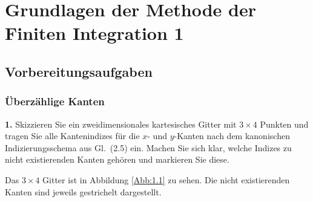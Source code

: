 \documentclass[Protokollheft.tex]{subfiles}
\begin{document}
\chapter{Grundlagen der Methode der Finiten Integration 1}
\section{Vorbereitungsaufgaben}
    {\subsection{Überzählige Kanten}}

        \begin{framed}
	\noindent \textbf{1.} Skizzieren Sie ein zweidimensionales kartesisches Gitter mit
        $3\times 4$ Punkten und tragen Sie alle Kantenindizes für die $x$-
        und $y$-Kanten nach dem kanonischen Indizierungsschema aus Gl.~(2.5) ein. Machen Sie sich klar, welche Indizes zu
        nicht existierenden Kanten gehören und markieren Sie diese.\label{exer:edgeIndices}
\end{framed}
\noindent
	Das $3\times 4$ Gitter ist in Abbildung \ref{Abb:1.1} zu sehen. Die nicht existierenden Kanten sind jeweils gestrichelt dargestellt.
\end{document}

